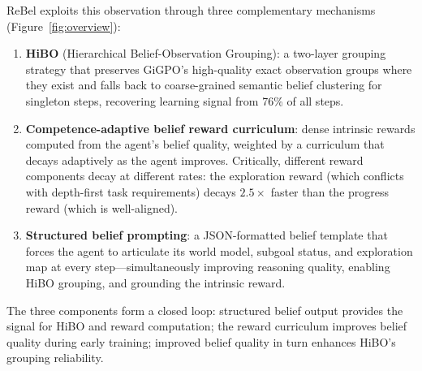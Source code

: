 \documentclass{article}
\begin{document}
ReBel exploits this observation through three complementary mechanisms (Figure~\ref{fig:overview}):

\begin{enumerate}[leftmargin=1.5em,itemsep=3pt]
  \item \textbf{HiBO} (Hierarchical Belief-Observation Grouping): a two-layer grouping
    strategy that preserves GiGPO's high-quality exact observation groups where they
    exist and falls back to coarse-grained semantic belief clustering for singleton steps,
    recovering learning signal from 76\% of all steps.

  \item \textbf{Competence-adaptive belief reward curriculum}: dense intrinsic
    rewards computed from the agent's belief quality, weighted by a curriculum
    that decays adaptively as the agent improves.
    Critically, different reward components decay at different rates:
    the exploration reward (which conflicts with depth-first task requirements)
    decays $2.5\times$ faster than the progress reward (which is well-aligned).

  \item \textbf{Structured belief prompting}: a JSON-formatted belief template
    that forces the agent to articulate its world model, subgoal status, and
    exploration map at every step---simultaneously improving reasoning quality,
    enabling HiBO grouping, and grounding the intrinsic reward.
\end{enumerate}

The three components form a closed loop: structured belief output provides the
signal for HiBO and reward computation; the reward curriculum improves belief
quality during early training; improved belief quality in turn enhances HiBO's
grouping reliability.
\end{document}
